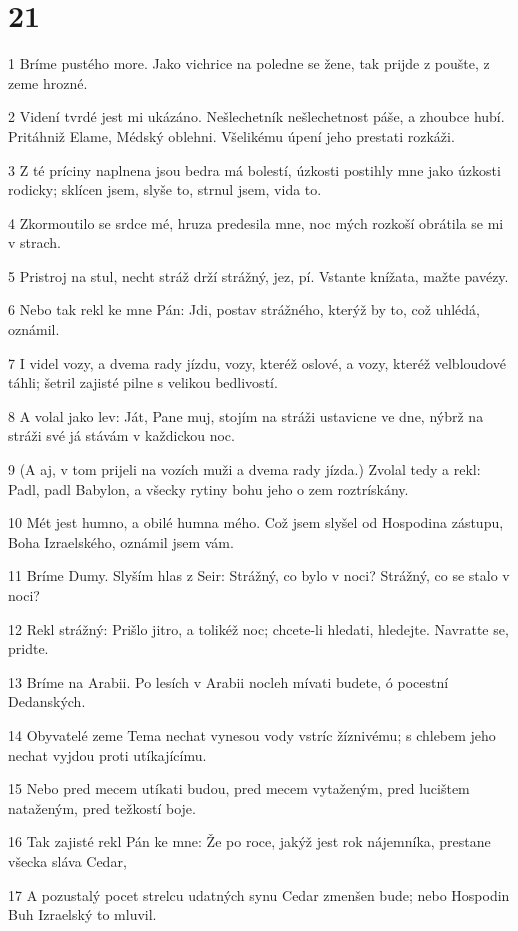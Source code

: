 \chapter{21}

\par 1 Bríme pustého more. Jako vichrice na poledne se žene, tak prijde z poušte, z zeme hrozné.
\par 2 Videní tvrdé jest mi ukázáno. Nešlechetník nešlechetnost páše, a zhoubce hubí. Pritáhniž Elame, Médský oblehni. Všelikému úpení jeho prestati rozkáži.
\par 3 Z té príciny naplnena jsou bedra má bolestí, úzkosti postihly mne jako úzkosti rodicky; sklícen jsem, slyše to, strnul jsem, vida to.
\par 4 Zkormoutilo se srdce mé, hruza predesila mne, noc mých rozkoší obrátila se mi v strach.
\par 5 Pristroj na stul, necht stráž drží strážný, jez, pí. Vstante knížata, mažte pavézy.
\par 6 Nebo tak rekl ke mne Pán: Jdi, postav strážného, kterýž by to, což uhlédá, oznámil.
\par 7 I videl vozy, a dvema rady jízdu, vozy, kteréž oslové, a vozy, kteréž velbloudové táhli; šetril zajisté pilne s velikou bedlivostí.
\par 8 A volal jako lev: Ját, Pane muj, stojím na stráži ustavicne ve dne, nýbrž na stráži své já stávám v každickou noc.
\par 9 (A aj, v tom prijeli na vozích muži a dvema rady jízda.) Zvolal tedy a rekl: Padl, padl Babylon, a všecky rytiny bohu jeho o zem roztrískány.
\par 10 Mét jest humno, a obilé humna mého. Což jsem slyšel od Hospodina zástupu, Boha Izraelského, oznámil jsem vám.
\par 11 Bríme Dumy. Slyším hlas z Seir: Strážný, co bylo v noci? Strážný, co se stalo v noci?
\par 12 Rekl strážný: Prišlo jitro, a tolikéž noc; chcete-li hledati, hledejte. Navratte se, pridte.
\par 13 Bríme na Arabii. Po lesích v Arabii nocleh mívati budete, ó pocestní Dedanských.
\par 14 Obyvatelé zeme Tema nechat vynesou vody vstríc žíznivému; s chlebem jeho nechat vyjdou proti utíkajícímu.
\par 15 Nebo pred mecem utíkati budou, pred mecem vytaženým, pred lucištem nataženým, pred težkostí boje.
\par 16 Tak zajisté rekl Pán ke mne: Že po roce, jakýž jest rok nájemníka, prestane všecka sláva Cedar,
\par 17 A pozustalý pocet strelcu udatných synu Cedar zmenšen bude; nebo Hospodin Buh Izraelský to mluvil.

